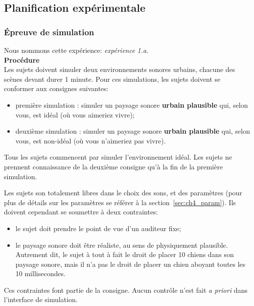 \subsection{Planification expérimentale}

\subsubsection{Épreuve de simulation}
\label{sec:ch5_planExpSimu}

Nous nommons cette expérience: \emph{expérience 1.a}. \\

\textbf{Procédure} \\

Les sujets doivent simuler deux environnements sonores urbains, chacune des scènes devant durer 1 minute. Pour ces simulations, les sujets doivent se conformer aux consignes suivantes:

\begin{itemize}
\item première simulation : simuler un paysage sonore \textbf{urbain plausible} qui, selon vous, est idéal (où vous aimeriez vivre);
\item deuxième simulation : simuler un paysage sonore \textbf{urbain plausible} qui, selon vous, est non-idéal (où vous n'aimeriez pas vivre).
\end{itemize}

Tous les sujets commencent par simuler l'environnement idéal. Les sujets ne prennent connaissance de la deuxième consigne qu'à la fin de la première simulation.

Les sujets son totalement libres dans le choix des sons, et des paramètres (pour plus de détails sur les paramètres se référer à la section~\ref{sec:ch4_param}). Ils doivent cependant se soumettre à deux contraintes:

\begin{itemize}
\item le sujet doit prendre le point de vue d’un auditeur fixe;

\item le paysage sonore doit être réaliste, au sens de physiquement plausible. Autrement dit, le sujet à tout à fait le droit de placer 10 chiens dans son paysage sonore, mais il n’a pas le droit de placer un chien aboyant toutes les 10 millisecondes.

\end{itemize}

Ces contraintes font partie de la consigne. Aucun contrôle n'est fait \emph{a priori} dans l'interface de simulation.


